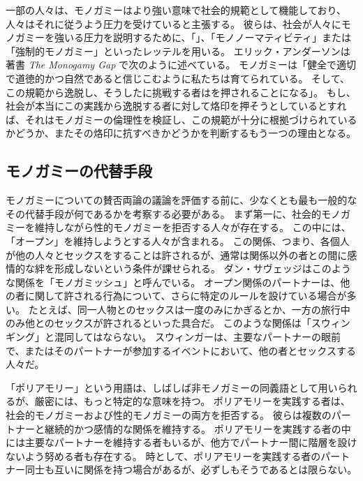 \documentclass[paper=a4,book,openany]{jlreq}
\newcommand{\ig}[1]{}           %
\begin{document}
一部の人々は、モノガミーはより強い意味で社会的規範として機能しており、人々はそれに従うよう圧力を受けていると主張する。
彼らは、社会が人々にモノガミーを強いる圧力を説明するために、「」、「モノノーマティビティ」または「強制的モノガミー」といったレッテルを用いる\citep[p.277]{emens04:_monog_law}。
エリック・アンダーソン\ig{Eric Anderson}は著書 \emph{The Monogamy Gap} で次のように述べている。
モノガミーは「健全で適切で道徳的かつ自然であると信じこむように私たちは育てられている。
そして、この規範から逸脱し、そうしたに挑戦する者はを押されることになる」\citep{anderson11:_monog_gap}。
もし、社会が本当にこの実践から逸脱する者に対して烙印を押そうとしているとすれば、それはモノガミーの倫理性を検証し、この規範が十分に根拠づけられているかどうか、またその烙印に抗すべきかどうかを判断するもう一つの理由となる。

\subsection{モノガミーの代替手段}

モノガミーについての賛否両論の議論を評価する前に、少なくとも最も一般的なその代替手段が何であるかを考察する必要がある。
まず第一に、社会的モノガミーを維持しながら性的モノガミーを拒否する人々が存在する。
この中には、「オープン」を維持しようとする人々が含まれる。
この関係、つまり、各個人が他の人々とセックスをすることは許されるが、通常は関係以外の者との間に感情的な絆を形成しないという条件が課せられる。
ダン・サヴェッジはこのような関係を「モノガミッシュ」と呼んでいる\citep{savage12:_savag_monogamish}。
オープン関係のパートナーは、他の者に関して許される行為について、さらに特定のルールを設けている場合が多い。
たとえば、同一人物とのセックスは一度のみにかぎるとか、一方の旅行中のみ他とのセックスが許されるといった具合だ。
このような関係は「スウィンギング」と混同してはならない。
スウィンガーは、主要なパートナーの眼前で、またはそのパートナーが参加するイベントにおいて、他の者とセックスする人々だ。

「ポリアモリー」という用語は、しばしば非モノガミーの同義語として用いられるが、厳密には、もっと特定的な意味を持つ。
ポリアモリーを実践する者は、社会的モノガミーおよび性的モノガミーの両方を拒否する。
彼らは複数のパートナーと継続的かつ感情的な関係を維持する。
ポリアモリーを実践する者の中には主要なパートナーを維持する者もいるが、他方でパートナー間に階層を設けないよう努める者も存在する。
時として、ポリアモリーを実践する者のパートナー同士も互いに関係を持つ場合があるが、必ずしもそうであるとは限らない。
\end{document}
